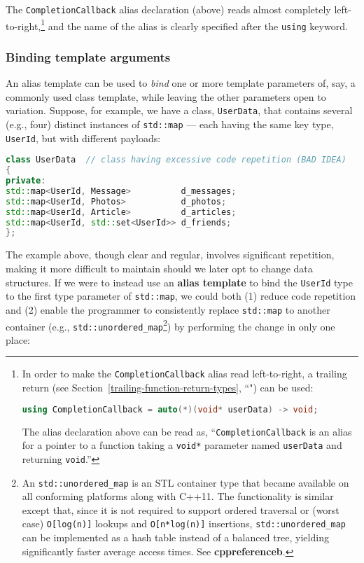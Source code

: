 \noindent The \texttt{CompletionCallback} alias declaration (above) reads almost
completely left-to-right,{\cprotect\footnote{In order to make the
\texttt{CompletionCallback} alias read left-to-right, a
trailing return (see Section~\ref{trailing-function-return-types}, ``") can be used:

\begin{lstlisting}[language=C++, basicstyle={\ttfamily\footnotesize}]
using CompletionCallback = auto(*)(void* userData) -> void;
\end{lstlisting}\vspace*{-1ex}

\noindent The alias declaration above can be read as,
``\texttt{CompletionCallback} is an alias for a pointer to a
function taking a \texttt{void*} parameter named \texttt{userData} and
returning \texttt{void}.''}} and the name of the alias is clearly
specified after the \texttt{using} keyword.

\subsubsection[Binding template arguments]{Binding template arguments}\label{binding-template-arguments}

An alias template can be used to \emph{bind} one or more template
parameters of, say, a commonly used class template, while leaving the
other parameters open to variation. Suppose, for example, we have a class, \texttt{UserData}, that contains
several (e.g., four) distinct instances of \texttt{std::map} --- each
having the same key type, \texttt{UserId}, but with different payloads:

\begin{lstlisting}[language=C++]
class UserData  // class having excessive code repetition (BAD IDEA)
{
private:
std::map<UserId, Message>          d_messages;
std::map<UserId, Photos>           d_photos;
std::map<UserId, Article>          d_articles;
std::map<UserId, std::set<UserId>> d_friends;
};
\end{lstlisting}

\noindent The example above, though clear and regular, involves significant
repetition, making it more difficult to maintain should we later opt to
change data structures. If we were to instead use an \textbf{alias
template} to bind the \texttt{UserId} type to the first type
parameter of \texttt{std::map}, we could both (1) reduce code repetition
and (2) enable the programmer to consistently replace \texttt{std::map}
to another container
(e.g., \texttt{std::unordered\_map}{\cprotect\footnote{An
\texttt{std::unordered\_map} is an STL container type that became
available on all conforming platforms along with C++11. The
functionality is similar except that, since it is not required to
support ordered traversal or (worst case) \texttt{O[log(n)]} lookups
and \texttt{O[n*log(n)]} insertions, \texttt{std::unordered\_map} can
be implemented as a hash table instead of a balanced tree, yielding
significantly faster average access times. See
\textbf{cppreferenceb}.}}) by performing the change in only
one place:

